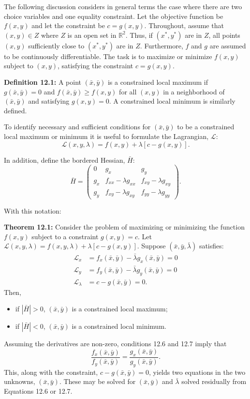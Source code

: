 \begin{original}
The following discussion considers in general terms the case where there are two choice variables and one equality constraint. Let the objective function be $f(x, y)$ and let the constraint be $c = g(x, y)$. Throughout, assume that $(x, y) \in Z$ where $Z$ is an open set in $\mathbb{R}^2$. Thus, if $(x^*, y^*)$ are in $Z$, all points $(x, y)$ sufficiently close to $(x^*, y^*)$ are in $Z$. Furthermore, $f$ and $g$ are assumed to be continuously differentiable. The task is to maximize or minimize $f(x, y)$ subject to $(x, y)$, satisfying the constraint $c = g(x, y)$.

\textbf{Definition 12.1:} A point $(\bar{x}, \bar{y})$ is a constrained local maximum if $g(\bar{x}, \bar{y}) = 0$ and $f(\bar{x}, \bar{y}) \geq f(x, y)$ for all $(x, y)$ in a neighborhood of $(\bar{x}, \bar{y})$ and satisfying $g(x, y) = 0$. A constrained local minimum is similarly defined.

To identify necessary and sufficient conditions for $(\bar{x}, \bar{y})$ to be a constrained local maximum or minimum it is useful to formulate the Lagrangian, $\mathcal{L}$:
\[
\mathcal{L}(x, y, \lambda) = f(x, y) + \lambda[c - g(x, y)]. \tag{12.4}
\]

In addition, define the bordered Hessian, $\bar{H}$:
\[
\bar{H} = \begin{pmatrix}
0 & g_x & g_y \\
g_x & f_{xx} - \lambda g_{xx} & f_{xy} - \lambda g_{xy} \\
g_y & f_{xy} - \lambda g_{xy} & f_{yy} - \lambda g_{yy}
\end{pmatrix}. \tag{12.5}
\]

With this notation:

\textbf{Theorem 12.1:} Consider the problem of maximizing or minimizing the function $f(x, y)$ subject to a constraint $g(x, y) = c$. Let $\mathcal{L}(x, y, \lambda) = f(x, y, \lambda) + \lambda[c - g(x, y)]$. Suppose $(\bar{x}, \bar{y}, \bar{\lambda})$ satisfies:
\begin{align}
\mathcal{L}_x &= f_x(\bar{x}, \bar{y}) - \bar{\lambda} g_x(\bar{x}, \bar{y}) = 0 \tag{12.6}\\
\mathcal{L}_y &= f_y(\bar{x}, \bar{y}) - \bar{\lambda} g_y(\bar{x}, \bar{y}) = 0 \tag{12.7}\\
\mathcal{L}_\lambda &= c - g(\bar{x}, \bar{y}) = 0. \tag{12.8}
\end{align}
Then,
\begin{itemize}
\item if $|\bar{H}| > 0$, $(\bar{x}, \bar{y})$ is a constrained local maximum;
\item if $|\bar{H}| < 0$, $(\bar{x}, \bar{y})$ is a constrained local minimum.
\end{itemize}

Assuming the derivatives are non-zero, conditions 12.6 and 12.7 imply that
\[
\frac{f_x(\bar{x}, \bar{y})}{f_y(\bar{x}, \bar{y})} = \frac{g_x(\bar{x}, \bar{y})}{g_y(\bar{x}, \bar{y})}.
\]
This, along with the constraint, $c - g(\bar{x}, \bar{y}) = 0$, yields two equations in the two unknowns, $(\bar{x}, \bar{y})$. These may be solved for $(\bar{x}, \bar{y})$ and $\bar{\lambda}$ solved residually from Equations 12.6 or 12.7.
\end{original}
